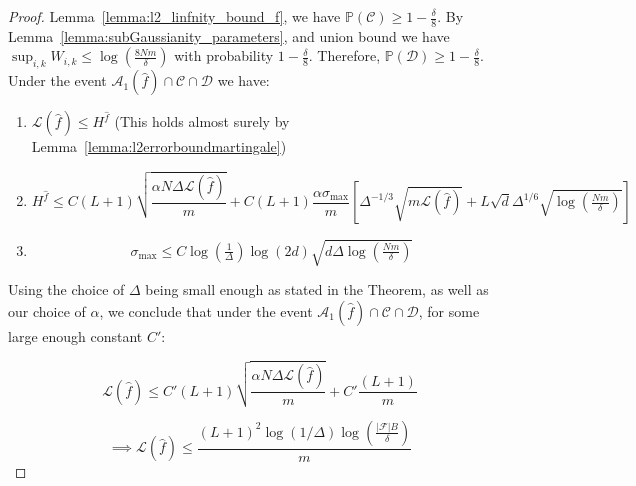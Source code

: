 \begin{proof}
Lemma~\ref{lemma:l2_linfnity_bound_f}, we have $\mathbb{P}(\mathcal{C})\geq 1-\frac{\delta}{8}$. By Lemma~\ref{lemma:subGaussianity_parameters}, and union bound we have $\sup_{i,k}W_{i,k} \leq \log(\tfrac{8Nm}{\delta})$ with probability $1-\frac{\delta}{8}$. Therefore, $\mathbb{P}(\mathcal{D}) \geq 1-\tfrac{\delta}{8}$. Under the event $\mathcal{A}_1(\hat{f})\cap \mathcal{C}\cap\mathcal{D}$ we have:

\begin{enumerate}
    \item $\mathcal{L}(\hat{f}) \leq H^{\hat{f}}$ (This holds almost surely by Lemma~\ref{lemma:l2errorboundmartingale})
    \item $$H^{\hat{f}} \leq C(L+1)\sqrt{\frac{\alpha N \Delta \mathcal{L}(\hat{f})}{m}} + C(L+1)\frac{\alpha\sigma_{\max}}{m}\left[ \Delta^{-1/3}\sqrt{m\mathcal{L}(\hat{f})} + L\sqrt{d}\Delta^{1/6}\sqrt{\log(\tfrac{Nm}{\delta})}\right]$$
    \item $$\sigma_{\max} \leq C\log(\tfrac{1}{\Delta})\log(2d)\sqrt{d\Delta \log(\tfrac{Nm}{\delta})}$$
\end{enumerate}
Using the choice of $\Delta$ being small enough as stated in the Theorem, as well as our choice of $\alpha$, we conclude that under the event $\mathcal{A}_1(\hat{f})\cap \mathcal{C}\cap\mathcal{D}$, for some large enough constant $C'$:

$$\mathcal{L}(\hat{f}) \leq C'(L+1)\sqrt{\frac{\alpha N \Delta \mathcal{L}(\hat{f})}{m}} + C'\frac{(L+1)}{m}$$

$$\implies \mathcal{L}(\hat{f}) \leq \frac{(L+1)^2\log(1/\Delta)\log(\tfrac{|\mathcal F| B}{\delta})}{m}$$



\end{proof}
